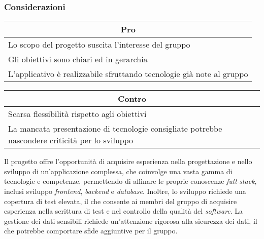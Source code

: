 \subsubsection{Considerazioni}
\begin{minipage}[t]{0.45\linewidth}
    \vspace{0pt}
    {\renewcommand{\arraystretch}{1.5}
    \begin{tabular}{p{1\linewidth}}
        \multicolumn{1}{c}{\textbf{Pro}} \\
        \midrule
        Lo scopo del progetto suscita l'interesse del gruppo \\
        Gli obiettivi sono chiari ed in gerarchia \\
        L'applicativo è realizzabile sfruttando tecnologie già note al gruppo \\
        \hline
    \end{tabular}
    }
\end{minipage}
\hspace{0.05\linewidth}
\begin{minipage}[t]{0.45\linewidth}
    \vspace{0pt}
    {\renewcommand{\arraystretch}{1.5}
    \begin{tabular}{p{1\linewidth}}
        \multicolumn{1}{c}{\textbf{Contro}} \\
        \midrule
        Scarsa flessibilità rispetto agli obiettivi \\
        La mancata presentazione di tecnologie consigliate potrebbe nascondere criticità per lo sviluppo\\
        \hline
    \end{tabular}
    }
\end{minipage}
\vspace{1em}

\noindent
Il progetto offre l'opportunità di acquisire esperienza nella progettazione e nello sviluppo di un'applicazione complessa, che coinvolge una vasta gamma di tecnologie e competenze, permettendo di affinare le proprie conoscenze \textit{full-stack}, inclusi sviluppo \textit{frontend}, \textit{backend} e \textit{database}.
Inoltre, lo sviluppo richiede una copertura di test elevata, il che consente ai membri del gruppo di acquisire esperienza nella scrittura di test e nel controllo della qualità del \textit{software}.
La gestione dei dati sensibili richiede un'attenzione rigorosa alla sicurezza dei dati, il che potrebbe comportare sfide aggiuntive per il gruppo.


